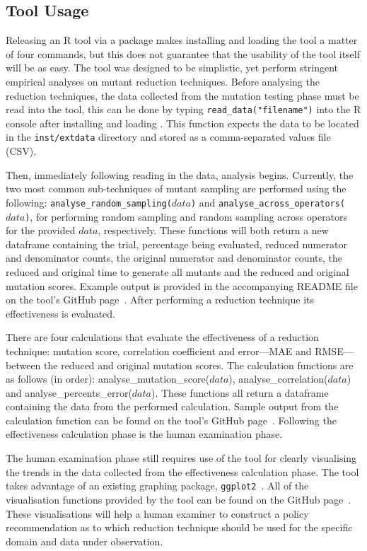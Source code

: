 \subsection{Tool Usage}

Releasing an R tool via a package makes installing and loading the tool
a matter of four commands, but this does not guarantee that the usability
of the tool itself will be as easy. The \mr tool was designed to be simplistic,
yet perform stringent empirical analyses on mutant reduction techniques. Before
analysing the reduction techniques, the data collected from the mutation testing
phase must be read into the \mr tool, this can be done by typing {\small\texttt{read\_data("filename")}}
into the R console after installing and loading \mr. This function expects the data
to be located in the \texttt{inst/extdata} directory and stored as a comma-separated values
file (CSV).

Then, immediately following reading in the data, analysis begins. Currently, the two most common
sub-techniques of mutant sampling are performed using the following:
\texttt{analyse\_random\_sampling($data$)} and \texttt{analyse\_across\_operators($data$)},
for performing random sampling and random sampling across operators for the provided $data$, respectively.
These functions will both return a new dataframe containing the trial, percentage being evaluated, reduced
numerator and denominator counts, the original numerator and denominator counts, the reduced and original time
to generate all mutants and the reduced and original mutation scores. Example output is provided in the accompanying
README file on the tool's GitHub page~\cite{mrstudyr}. After performing a reduction technique its effectiveness
is evaluated.

There are four calculations that evaluate the effectiveness of a reduction technique: mutation score, correlation coefficient
and error---MAE and RMSE---between the reduced and original mutation scores. The calculation functions are as follows (in order):
analyse\_mutation\_score($data$), analyse\_correlation($data$) and analyse\_percents\_error($data$). These functions all return
a dataframe containing the data from the performed calculation. Sample output from the calculation function can be found on
the tool's GitHub page~\cite{mrstudyr}. Following the effectiveness calculation phase is the human examination phase.

The human examination phase still requires use of the \mr tool for clearly visualising the trends in the data
collected from the effectiveness calculation phase. The \mr tool takes advantage of an existing graphing package, \texttt{ggplot2}~\cite{ggplot2}.
All of the visualisation functions provided by the \mr tool can be found on the GitHub page~\cite{mrstudyr}. These
visualisations will help a human examiner to construct a policy recommendation as to which reduction technique
should be used for the specific domain and data under observation.
